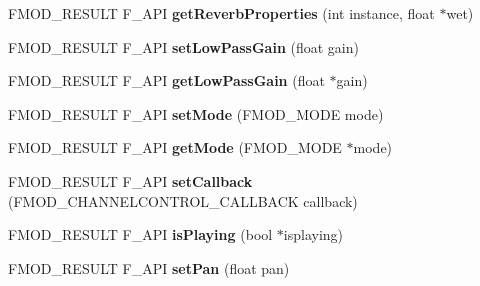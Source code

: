 \begin{DoxyCompactItemize}
\item 
\hypertarget{class_f_m_o_d_1_1_channel_control_abf0c86eaa2826416a84e1114978f6d63}{F\+M\+O\+D\+\_\+\+R\+E\+S\+U\+L\+T F\+\_\+\+A\+P\+I {\bfseries get\+Reverb\+Properties} (int instance, float $\ast$wet)}\label{class_f_m_o_d_1_1_channel_control_abf0c86eaa2826416a84e1114978f6d63}

\item 
\hypertarget{class_f_m_o_d_1_1_channel_control_a3f4659365019871bb8ab4dc3e789d011}{F\+M\+O\+D\+\_\+\+R\+E\+S\+U\+L\+T F\+\_\+\+A\+P\+I {\bfseries set\+Low\+Pass\+Gain} (float gain)}\label{class_f_m_o_d_1_1_channel_control_a3f4659365019871bb8ab4dc3e789d011}

\item 
\hypertarget{class_f_m_o_d_1_1_channel_control_abb54e1684b1392e44b22692ee434e20f}{F\+M\+O\+D\+\_\+\+R\+E\+S\+U\+L\+T F\+\_\+\+A\+P\+I {\bfseries get\+Low\+Pass\+Gain} (float $\ast$gain)}\label{class_f_m_o_d_1_1_channel_control_abb54e1684b1392e44b22692ee434e20f}

\item 
\hypertarget{class_f_m_o_d_1_1_channel_control_a8322277ea91a5468d2515685648229eb}{F\+M\+O\+D\+\_\+\+R\+E\+S\+U\+L\+T F\+\_\+\+A\+P\+I {\bfseries set\+Mode} (F\+M\+O\+D\+\_\+\+M\+O\+D\+E mode)}\label{class_f_m_o_d_1_1_channel_control_a8322277ea91a5468d2515685648229eb}

\item 
\hypertarget{class_f_m_o_d_1_1_channel_control_abda2185be172412ca5dc8b33629ecf2c}{F\+M\+O\+D\+\_\+\+R\+E\+S\+U\+L\+T F\+\_\+\+A\+P\+I {\bfseries get\+Mode} (F\+M\+O\+D\+\_\+\+M\+O\+D\+E $\ast$mode)}\label{class_f_m_o_d_1_1_channel_control_abda2185be172412ca5dc8b33629ecf2c}

\item 
\hypertarget{class_f_m_o_d_1_1_channel_control_a987b936c38877c520259afa3cf2cb78e}{F\+M\+O\+D\+\_\+\+R\+E\+S\+U\+L\+T F\+\_\+\+A\+P\+I {\bfseries set\+Callback} (F\+M\+O\+D\+\_\+\+C\+H\+A\+N\+N\+E\+L\+C\+O\+N\+T\+R\+O\+L\+\_\+\+C\+A\+L\+L\+B\+A\+C\+K callback)}\label{class_f_m_o_d_1_1_channel_control_a987b936c38877c520259afa3cf2cb78e}

\item 
\hypertarget{class_f_m_o_d_1_1_channel_control_a015a66e7e735b8043cf431eef7bd08ec}{F\+M\+O\+D\+\_\+\+R\+E\+S\+U\+L\+T F\+\_\+\+A\+P\+I {\bfseries is\+Playing} (bool $\ast$isplaying)}\label{class_f_m_o_d_1_1_channel_control_a015a66e7e735b8043cf431eef7bd08ec}

\item 
\hypertarget{class_f_m_o_d_1_1_channel_control_a1291d831432f360a41fb0b92006a04ca}{F\+M\+O\+D\+\_\+\+R\+E\+S\+U\+L\+T F\+\_\+\+A\+P\+I {\bfseries set\+Pan} (float pan)}\label{class_f_m_o_d_1_1_channel_control_a1291d831432f360a41fb0b92006a04ca}


\end{DoxyCompactItemize}
